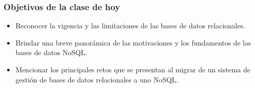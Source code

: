\begin{frame}
    \frametitle{Objetivos de la clase de hoy}

    \begin{itemize}[<+->]
        \item Reconocer la vigencia y las limitaciones de las bases de datos relacionales. 
        \item Brindar una breve panorámica de las motivaciones y los fundamentos de las bases de datos NoSQL.
        \item Mencionar los principales retos que se presentan al migrar de un sistema de gestión de bases de datos relacionales a uno NoSQL.
    \end{itemize}
\end{frame}
